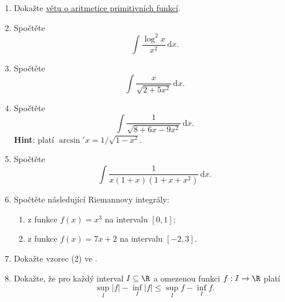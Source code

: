 \section*{}
\begin{enumerate}
 \item Dokažte \hyperref[thm:aritmetika-primitivnich-funkci]{větu o aritmetice
  primitivních funkcí}.
 \item Spočtěte
  \[
   \int \frac{\log^2 x}{x^2} \, \mathrm{d}x.
  \]
 \item Spočtěte
  \[
   \int \frac{x}{\sqrt{2 + 5x^2}} \, \mathrm{d}x.
  \]
 \item Spočtěte
  \[
   \int \frac{1}{\sqrt{8 + 6x - 9x^2}} \, \mathrm{d}x.
  \]
  \textbf{Hint}: platí $\arcsin'x = 1 / \sqrt{1 - x^2}$.
 \item 
  Spočtěte
  \[
   \int \frac{1}{x(1+x)(1 + x + x^2)} \, \mathrm{d}x. 
  \]
 \item Spočtěte následující Riemannovy integrály:
  \begin{enumerate}
   \item z funkce $f(x) = x^3$ na intervalu $[0,1]$;
   \item z funkce $f(x) = 7x + 2$ na intervalu $[-2,3]$.
  \end{enumerate}
 \item Dokažte vzorec (2) ve .
 \item Dokažte, že pro každý interval $I \subseteq \R$ a omezenou funkci $f:I
  \to \R$ platí
  \[
   \sup_I |f| - \inf_I |f| \leq \sup_I f - \inf_I f.
  \]
\end{enumerate}
